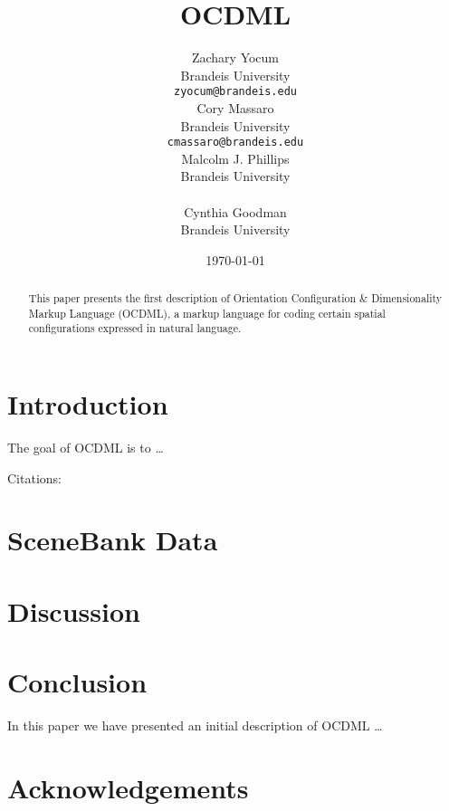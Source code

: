 \documentclass[11pt]{article}
\title{OCDML}
\author{
    Zachary Yocum \\
    Brandeis University \\
    \texttt{zyocum@brandeis.edu} \\\And
    Cory Massaro \\
    Brandeis University \\
    \texttt{cmassaro@brandeis.edu} \\\And
    Malcolm J. Phillips \\
    Brandeis University \\
    \textt{icos@brandeis.edu} \\\And
    Cynthia Goodman\\
    Brandeis University \\
    \textt{cpg@brandeis.edu}
    }
\date{\today}
\begin{document}
\maketitle

%


\begin{abstract}
This paper presents the first description of Orientation Configuration \& Dimensionality Markup Language (OCDML), a markup language for coding certain spatial configurations expressed in natural language.
\end{abstract}

\section{Introduction} %
\label{sec:introduction}
The goal of OCDML is to \ldots

Citations:
\cite{cohn1997qualitative}
\cite{isli2000new}
\cite{cristani2002spaceml}
\cite{slobin2001sign}
\cite{mani2010spatialml}
\cite{talmy1978figure}
\cite{herskovits1980spatial}

\section{SceneBank Data} %
\label{scenebank_data}

\section{Discussion} %
\label{sec:discussion}

\section{Conclusion} %
\label{sec:conclusion}
In this paper we have presented an initial description of OCDML \ldots

\section*{Acknowledgements} %
\label{sec:acknowledgements}




\end{document}

